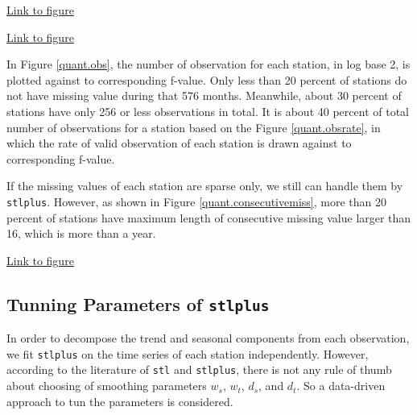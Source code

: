 \begin{framed}
\begin{center}
  \href{../plots/a1950/a1950.obs.station.pdf}{Link to figure}
  \label{quant.obs}
\end{center}
\end{framed}

\begin{framed}
\begin{center}
  \href{../plots/a1950/a1950.obsrate.station.pdf}{Link to figure}
  \label{quant.obsrate}
\end{center}
\end{framed}

In Figure \href{../plots/a1950/a1950.obs.station.pdf}{\ref*{quant.obs}}, the 
number of observation for each station, in log base 2, is plotted against to 
corresponding f-value. Only less than 20 percent of stations do not have missing
value during that 576 months. Meanwhile, about 30 percent of stations have only
256 or less observations in total. It is about 40 percent of total number of 
observations for a station based on the Figure 
\href{../plots/a1950/a1950.obsrate.station.pdf}{\ref*{quant.obsrate}}, in which 
the rate of valid observation of each station is drawn against to corresponding 
f-value.

If the missing values of each station are sparse only, we still can handle them 
by \texttt{stlplus}. However, as shown in Figure 
\href{../plots/a1950/a1950.consecutive.miss.station.pdf}{\ref*{quant.consecutivemiss}},
more than 20 percent of stations have maximum length of consecutive missing value 
larger than 16, which is more than a year. 

\begin{framed}
\begin{center}
  \href{../plots/a1950/a1950.consecutive.miss.station.pdf}{Link to figure}
  \label{quant.consecutivemiss}
\end{center}
\end{framed}

\subsection{Tunning Parameters of \texttt{stlplus}}

In order to decompose the trend and seasonal components from each observation, we 
fit \texttt{stlplus} on the time series of each station independently. However,
according to the literature of \texttt{stl} and \texttt{stlplus}, there is not 
any rule of thumb about choosing of smoothing parameters $w_s$, $w_t$, $d_s$, and 
$d_t$. So a data-driven approach to tun the parameters is considered. 

